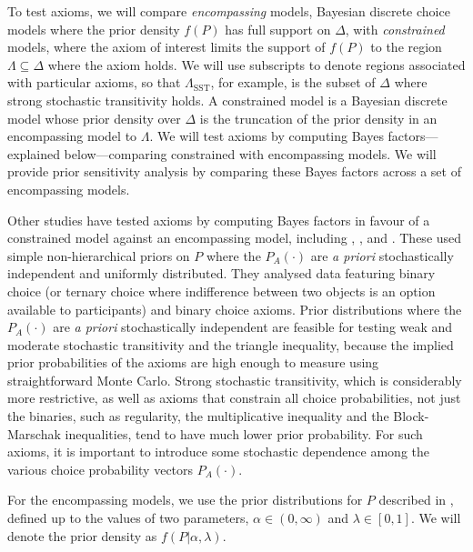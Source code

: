 \documentclass[11pt,letter]{article}
\begin{document}
To test axioms, we will compare {\em encompassing} models, Bayesian discrete choice models where the prior density $f(P)$ has full support on $\Delta$, with {\em constrained} models, where the axiom of interest limits the support of $f(P)$ to the region $\Lambda \subseteq \Delta$ where the axiom holds.
We will use subscripts to denote regions associated with particular axioms, so that $\Lambda_{\mathrm{SST}}$, for example, is the subset of $\Delta$ where strong stochastic transitivity holds.
A constrained model is a Bayesian discrete model whose prior density over $\Delta$ is the truncation of the prior density in an encompassing model to $\Lambda$.
We will test axioms by computing Bayes factors---explained below---comparing constrained with encompassing models.
We will provide prior sensitivity analysis by comparing these Bayes factors across a set of encompassing models.

Other studies have tested axioms by computing Bayes factors in favour of a constrained model against an encompassing model, including , ,  and .
These used simple non-hierarchical priors on $P$ where the $P_A(\cdot)$ are {\em a priori} stochastically independent and uniformly distributed.
They analysed data featuring binary choice (or ternary choice where indifference between two objects is an option available to participants) and binary choice axioms.
Prior distributions where the $P_A(\cdot)$ are {\em a priori} stochastically independent are feasible for testing weak and moderate stochastic transitivity and the triangle inequality, because the implied prior probabilities of the axioms are high enough to measure using straightforward Monte Carlo.
Strong stochastic transitivity, which is considerably more restrictive, as well as axioms that constrain all choice probabilities, not just the binaries, such as regularity, the multiplicative inequality and the Block-Marschak inequalities, tend to have much lower prior probability.
For such axioms, it is important to introduce some stochastic dependence among the various choice probability vectors $P_A(\cdot)$.

For the encompassing models, we use the prior distributions for $P$ described in , defined up to the values of two parameters, $\alpha \in (0,\infty)$ and $\lambda \in [0,1]$.
We will denote the prior density as $f(P|\alpha,\lambda)$.
\end{document}

